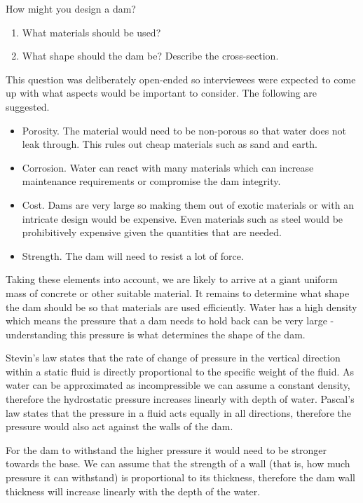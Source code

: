\question
{}

How might you design a dam?

\begin{hints}
	\begin{enumerate}
		\item What materials should be used?
		\item What shape should the dam be? Describe the cross-section.
	\end{enumerate}
\end{hints}

\begin{solution}

	This question was deliberately open-ended so interviewees were expected to come up with what aspects would be important to consider. The following are suggested.
	\begin{itemize}
		\item Porosity. The material would need to be non-porous so that water does not leak through. This rules out cheap materials such as sand and earth.
		\item Corrosion. Water can react with many materials which can increase maintenance requirements or compromise the dam integrity.
		\item Cost. Dams are very large so making them out of exotic materials or with an intricate design would be expensive. Even materials such as steel would be prohibitively expensive given the quantities that are needed.
		\item Strength. The dam will need to resist a lot of force.
	\end{itemize}
	
	Taking these elements into account, we are likely to arrive at a giant uniform mass of concrete or other suitable material. It remains to determine what shape the dam should be so that materials are used efficiently. Water has a high density which means the pressure that a dam needs to hold back can be very large - understanding this pressure is what determines the shape of the dam.
	
	Stevin's law states that the rate of change of pressure in the vertical direction within a static fluid is directly proportional to the specific weight of the fluid. As water can be approximated as incompressible we can assume a constant density, therefore the hydrostatic pressure increases linearly with depth of water. Pascal's law states that the pressure in a fluid acts equally in all directions, therefore the pressure would also act against the walls of the dam.
	
	For the dam to withstand the higher pressure it would need to be stronger towards the base. We can assume that the strength of a wall (that is, how much pressure it can withstand) is proportional to its thickness, therefore the dam wall thickness will increase linearly with the depth of the water.

\end{solution}